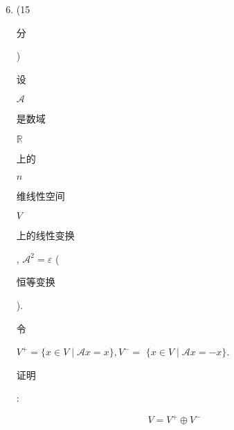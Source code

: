 \documentclass[10pt]{article}
\begin{document}
\begin{enumerate}
  \setcounter{enumi}{5}
  \item (15 \begin{CJK}{UTF8}{mj}分\end{CJK}) \begin{CJK}{UTF8}{mj}设\end{CJK} $\mathscr{A}$ \begin{CJK}{UTF8}{mj}是数域\end{CJK} $\mathbb{R}$ \begin{CJK}{UTF8}{mj}上的\end{CJK} $n$ \begin{CJK}{UTF8}{mj}维线性空间\end{CJK} $V$ \begin{CJK}{UTF8}{mj}上的线性变换\end{CJK}, $\mathscr{A}^{2}=\varepsilon$ (\begin{CJK}{UTF8}{mj}恒等变换\end{CJK}). \begin{CJK}{UTF8}{mj}令\end{CJK} $V^{+}=\{x \in V \mid \mathscr{A} x=x\}, V^{-}=$ $\{x \in V \mid \mathscr{A} x=-x\}$. \begin{CJK}{UTF8}{mj}证明\end{CJK}:
\end{enumerate}
$$
V=V^{+} \oplus V^{-}
$$
\end{document}
